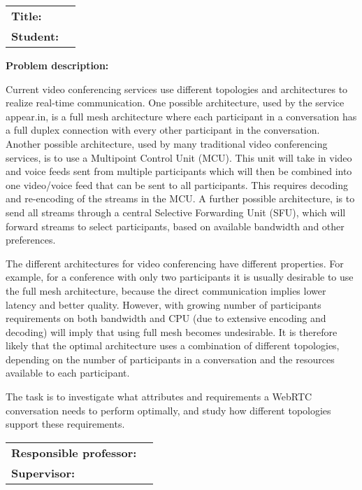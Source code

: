 \begin{titlingpage}

\noindent
\begin{tabular}{@{}p{4cm}l}
\textbf{Title:} 	& \thetitle \\
\textbf{Student:}	& \theauthor \\
\end{tabular}

\vspace{4ex}
\noindent\textbf{Problem description:}
\vspace{2ex}

Current video conferencing services use different topologies and architectures to realize real-time communication. One possible architecture, used by the service appear.in, is a full mesh architecture where each participant in a conversation has a full duplex connection with every other participant in the conversation. Another possible architecture, used by many traditional video conferencing services, is to use a Multipoint Control Unit (MCU). This unit will take in video and voice feeds sent from multiple participants which will then be combined into one video/voice feed that can be sent to all participants. This requires decoding and re-encoding of the streams in the MCU. A further possible architecture, is to send all streams through a central Selective Forwarding Unit (SFU), which will forward streams to select participants, based on available bandwidth and other preferences.

The different architectures for video conferencing have different properties. For example, for a conference with only two participants it is usually desirable to use the full mesh architecture, because the direct communication implies lower latency and better quality. However, with growing number of participants requirements on both bandwidth and CPU (due to extensive encoding and decoding) will imply that using full mesh becomes undesirable.  It is therefore likely that the optimal architecture uses a combination of different topologies, depending on the number of participants in a conversation and the resources available to each participant.

The task is to investigate what attributes and requirements a WebRTC conversation needs to perform optimally, and study how different topologies support these requirements.

\vspace{6ex}

\noindent
\begin{tabular}{@{}p{4cm}l}
\textbf{Responsible professor:} 	& \theprofessor \\
\textbf{Supervisor:}			& \thesupervisor \\
\end{tabular}

\end{titlingpage}
